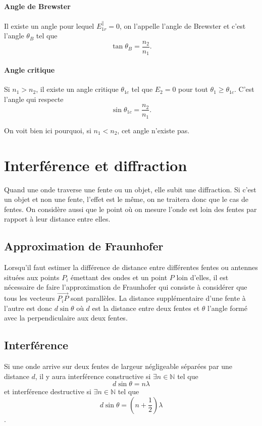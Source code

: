 \paragraph{Angle de Brewster}
Il existe un angle pour lequel $E_{1r}^\parallel = 0$,
on l'appelle l'angle de Brewster et c'est l'angle $\theta_B$ tel que
\[ \tan\theta_B = \frac{n_2}{n_1}. \]

\paragraph{Angle critique}
Si $n_1 > n_2$, il existe un angle critique $\theta_{1c}$ tel que
$E_{2} = 0$ pour tout $\theta_1 \geq \theta_{1c}$.
C'est l'angle qui respecte
\[ \sin\theta_{1c} = \frac{n_2}{n_1}. \]

On voit bien ici pourquoi, si $n_1 < n_2$, cet angle n'existe pas.

\section{Interférence et diffraction}
Quand une onde traverse une fente ou un objet, elle subit une diffraction.
Si c'est un objet et non une fente, l'effet est le même,
on ne traitera donc que le cas de fentes.
On considère aussi que le point où on mesure l'onde est loin des fentes
par rapport à leur distance entre elles.

\subsection{Approximation de Fraunhofer}
\label{sec:fraunhofer}
Lorsqu'il faut estimer la différence de distance entre différentes
fentes ou antennes situées aux points $P_i$ émettant des ondes
et un point $P$ loin d'elles,
il est nécessaire de faire l'approximation de Fraunhofer qui
consiste à considérer que tous les vecteurs $\vec{P_iP}$
sont parallèles.
La distance supplémentaire d'une fente à l'autre est donc $d\sin\theta$
où $d$ est la distance entre deux fentes et $\theta$ l'angle
formé avec la perpendiculaire aux deux fentes.

\subsection{Interférence}
Si une onde arrive sur deux fentes de largeur négligeable séparées par
une distance $d$,
il y aura interférence constructive si $\exists n \in \mathbb{N}$ tel que
\[ d\sin\theta = n \lambda \]
et interférence destructive si $\exists n \in \mathbb{N}$ tel que
\[ d\sin\theta = \left(n+\frac{1}{2}\right) \lambda \].

